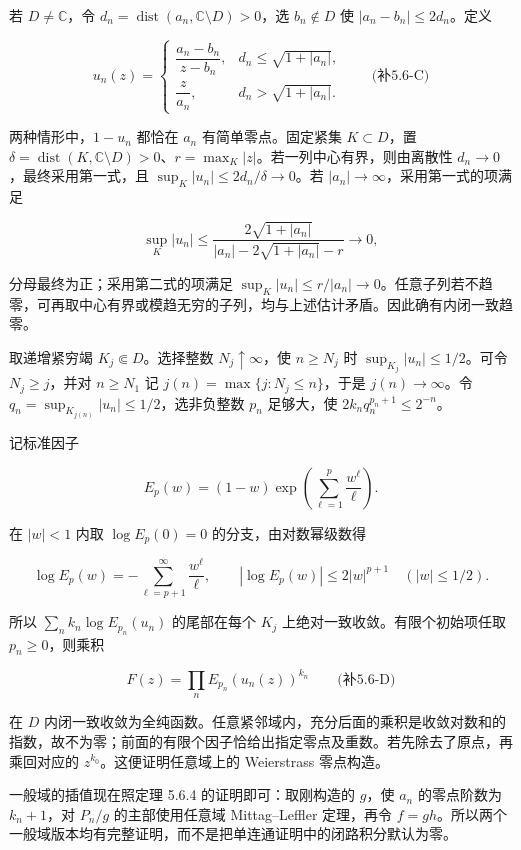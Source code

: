\documentclass[11pt,a4paper]{article}
\begin{document}
若 \(D\ne\mathbb C\)，令
\(d_n=\operatorname{dist}(a_n,\mathbb C\setminus D)>0\)，选
\(b_n\notin D\) 使 \(|a_n-b_n|\le2d_n\)。定义

\[
u_n(z)=\begin{cases}
\dfrac{a_n-b_n}{z-b_n},&d_n\le\sqrt{1+|a_n|},\\[4pt]
\dfrac z{a_n},&d_n>\sqrt{1+|a_n|}.
\end{cases}
\qquad\text{(补5.6-C)}
\]

两种情形中，\(1-u_n\) 都恰在 \(a_n\) 有简单零点。固定紧集
\(K\subset D\)，置
\(\delta=\operatorname{dist}(K,\mathbb C\setminus D)>0\)、\(r=\max_K|z|\)。若一列中心有界，则由离散性
\(d_n\to0\)，最终采用第一式，且 \(\sup_K|u_n|\le2d_n/\delta\to0\)。若
\(|a_n|\to\infty\)，采用第一式的项满足

\[
\sup_K|u_n|\le
\frac{2\sqrt{1+|a_n|}}{|a_n|-2\sqrt{1+|a_n|}-r}\longrightarrow0,
\]

分母最终为正；采用第二式的项满足
\(\sup_K|u_n|\le r/|a_n|\to0\)。任意子列若不趋零，可再取中心有界或模趋无穷的子列，均与上述估计矛盾。因此确有内闭一致趋零。

取递增紧穷竭 \(K_j\Subset D\)。选择整数 \(N_j\uparrow\infty\)，使
\(n\ge N_j\) 时 \(\sup_{K_j}|u_n|\le1/2\)。可令 \(N_j\ge j\)，并对
\(n\ge N_1\) 记 \(j(n)=\max\{j:N_j\le n\}\)，于是 \(j(n)\to\infty\)。令
\(q_n=\sup_{K_{j(n)}}|u_n|\le1/2\)，选非负整数 \(p_n\) 足够大，使
\(2k_nq_n^{p_n+1}\le2^{-n}\)。

记标准因子

\[
E_p(w)=(1-w)\exp\left(\sum_{\ell=1}^p\frac{w^\ell}{\ell}\right).
\]

在 \(|w|<1\) 内取 \(\log E_p(0)=0\) 的分支，由对数幂级数得

\[
\log E_p(w)=-\sum_{\ell=p+1}^\infty\frac{w^\ell}{\ell},\qquad
|\log E_p(w)|\le2|w|^{p+1}\quad(|w|\le1/2).
\]

所以 \(\sum_n k_n\log E_{p_n}(u_n)\) 的尾部在每个 \(K_j\)
上绝对一致收敛。有限个初始项任取 \(p_n\ge0\)，则乘积

\[
F(z)=\prod_n E_{p_n}(u_n(z))^{k_n}
\qquad\text{(补5.6-D)}
\]

在 \(D\)
内闭一致收敛为全纯函数。任意紧邻域内，充分后面的乘积是收敛对数和的指数，故不为零；前面的有限个因子恰给出指定零点及重数。若先除去了原点，再乘回对应的
\(z^{k_0}\)。这便证明任意域上的 Weierstrass 零点构造。

一般域的插值现在照定理 5.6.4 的证明即可：取刚构造的 \(g\)，使 \(a_n\)
的零点阶数为 \(k_n+1\)，对 \(P_n/g\) 的主部使用任意域 Mittag--Leffler
定理，再令
\(f=gh\)。所以两个一般域版本均有完整证明，而不是把单连通证明中的闭路积分默认为零。
\end{document}
